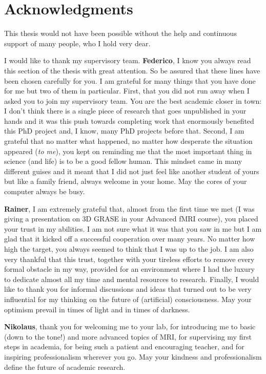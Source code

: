 \chapter{Acknowledgments}
This thesis would not have been possible without the help and continuous support of many people, who I hold very dear.

I would like to thank my supervisory team. \textbf{Federico}, I know you always read this section of the thesis with great attention. So be assured that these lines have been chosen carefully for you. I am grateful for many things that you have done for me but two of them in particular. First, that you did not run away when I asked you to join my supervisory team. You are the best academic closer in town: I don't think there is a single piece of research that goes unpublished in your hands and it was this push towards completing work that enormously benefited this PhD project and, I know, many PhD projects before that. Second, I am grateful that no matter what happened, no matter how desperate the situation appeared (\textit{to me}), you kept on reminding me that the most important thing in science (and life) is to be a good fellow human. This mindset came in many different guises and it meant that I did not just feel like another student of yours but like a family friend, always welcome in your home. May the cores of your computer always be busy.

\textbf{Rainer}, I am extremely grateful that, almost from the first time we met (I was giving a presentation on 3D GRASE in your Advanced fMRI course), you placed your trust in my abilities. I am not sure what it was that you saw in me but I am glad that it kicked off a successful cooperation over many years. No matter how high the target, you always seemed to think that I was up to the job. I am also very thankful that  this trust, together with your tireless efforts to remove every formal obstacle in my way, provided for an environment where I had the luxury to dedicate almost all my time and mental resources to research. Finally, I would like to thank you for informal discussions and ideas that turned out to be very influential for my thinking on the future of (artificial) consciousness. May your optimism prevail in times of light and in times of darkness.

\textbf{Nikolaus}, thank you for welcoming me to your lab, for introducing me to basic (down to the tone!) and more advanced topics of MRI, for supervising my first steps in academia, for being such a patient and encouraging teacher, and for inspiring professionalism wherever you go. May your kindness and professionalism define the future of academic research. 

